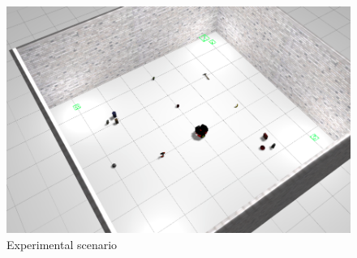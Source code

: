
\begin{figure}
\includegraphics[width=\linewidth]{src/clustered.png}
\caption{Experimental scenario}
\label{fig:experimental_scenario}
\end{figure}